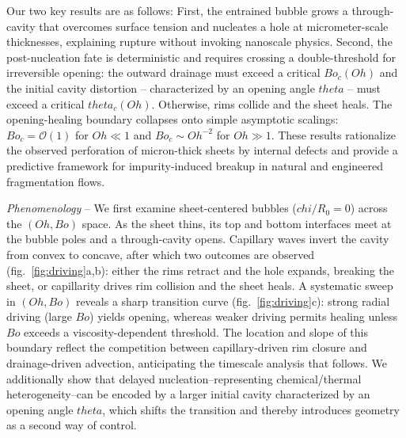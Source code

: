 \documentclass[reprint,amssymb,superscriptaddress,aps,prl,floatfix]{revtex4-2}
\def\chi{chi}%
\def\theta{theta}%
\begin{document}
Our two key results are as follows: First, the entrained bubble grows a through-cavity that
overcomes surface tension and nucleates a hole at micrometer-scale thicknesses, explaining
rupture without invoking nanoscale physics. Second, the post-nucleation fate is
deterministic and requires crossing a double-threshold for irreversible opening: the outward
drainage must exceed a critical $Bo_c(Oh)$ and the initial cavity distortion -- characterized
by an opening angle $\theta$ -- must exceed a critical $\theta_c(Oh)$. Otherwise, rims
collide and the sheet heals. The opening-healing boundary collapses onto simple asymptotic
scalings: $Bo_c=\mathcal{O}(1)$ for $Oh\ll1$ and $Bo_c\sim Oh^{-2}$ for $Oh\gg1$. These
results rationalize the observed perforation of micron-thick sheets by internal defects
and provide a predictive framework for impurity-induced breakup in natural and engineered
fragmentation flows.

{\it Phenomenology} -- 
We first examine sheet-centered bubbles ($\chi/R_0 = 0$) across the
$(Oh,Bo)$ space. As the sheet thins, its top and bottom interfaces meet at the bubble
poles and a through-cavity opens. Capillary waves invert the cavity from convex to
concave, after which two outcomes are observed (fig.~\ref{fig:driving}a,b): either the rims
retract and the hole expands, breaking the sheet, or capillarity drives rim collision and
the sheet heals. A systematic sweep in $(Oh,Bo)$ reveals a sharp transition curve
(fig.~\ref{fig:driving}c): strong radial driving (large $Bo$) yields opening, whereas
weaker driving permits healing unless $Bo$ exceeds a viscosity-dependent threshold. The
location and slope of this boundary reflect the competition between capillary-driven rim
closure and drainage-driven advection, anticipating the timescale analysis that follows.
We additionally show that delayed nucleation--representing chemical/thermal
heterogeneity--can be encoded by a larger initial cavity characterized by an opening angle
$\theta$, which shifts the transition and thereby introduces geometry as a second way of control.
\end{document}
